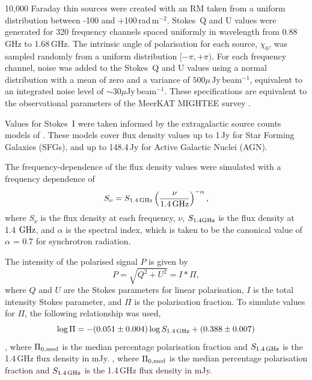 \documentclass[fleqn,usenatbib]{mnras}
\begin{document}

10,000 Faraday thin sources were created with an RM taken from a uniform distribution between -100 and +100\,rad\,m$^{-2}$. Stokes~Q and U values were generated for 320 frequency channels spaced uniformly in wavelength from 0.88\,GHz to 1.68\,GHz. The intrinsic angle of polarisation for each source, $\chi_0$, was sampled randomly from a uniform distribution $[-\pi, +\pi)$.
For each frequency channel, noise was added to the Stokes~Q and U values using a normal distribution with a mean of zero and a variance of $500\mu$\,Jy\,beam$^{-1}$, equivalent to an integrated noise level of $\sim 30\mu$Jy\,beam$^{-1}$. These specifications are equivalent to the observational parameters of the MeerKAT MIGHTEE survey \citep{Taylor_2017}.

Values for Stokes~I were taken informed by the extragalactic source counts models of \cite{dezotti}. These models cover flux density values up to 1\,Jy for Star Forming Galaxies (SFGs), and up to 148.4\,Jy for Active Galactic Nuclei (AGN).

The frequency-dependence of the flux density values were simulated with a frequency dependence of
%
\begin{equation}
\label{FreqDependent}
S_{\nu} = S_{\rm 1.4\,GHz}\left(\frac{\nu}{\rm 1.4\,GHz} \right)^{-\alpha},
\end{equation}
%
where $S_\nu$ is the flux density at each frequency, $\nu$, $S_{1.4\rm{GHz}}$ is the flux density at 1.4 $\rm{GHz}$, and $\alpha$ is the spectral index, which is taken to be the canonical value of $\alpha$ = 0.7 for synchrotron radiation.

The intensity of the polarised signal $P$ is given by
%
\begin{equation}
\label{eq:PolarisedSignal}
P = \sqrt{Q^2 + U^2} = I*\Pi,
\end{equation}
%
where $Q$ and $U$ are the Stokes parameters for linear polarisation, $I$ is the total intensity Stokes parameter, and $\Pi$ is the polarisation fraction. To simulate values for $\Pi$, the following relationship was used,
%
\begin{equation}
\label{eq:StilEquation}
\log \Pi = -(0.051\pm0.004) \log S_{\rm 1.4\,GHz} + (0.388\pm0.007)
\end{equation}
%
\citep{Stil_2014}, where $\Pi_{0, {\rm med}}$ is the median percentage polarisation fraction and $S_{\rm 1.4\,GHz}$ is the 1.4\,GHz flux density in mJy.
%
\citep{Stil_2014}, where $\Pi_{0, {\rm med}}$ is the median percentage polarisation fraction and $S_{\rm 1.4\,GHz}$ is the 1.4\,GHz flux density in mJy.
\end{document}
